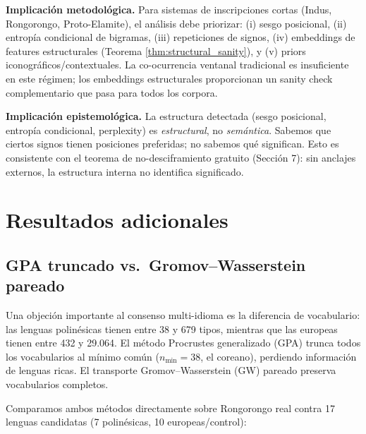 \documentclass[11pt,a4paper]{article}
\newcommand{\1}{\mathbf{1}}
\numberwithin{equation}{section}
\begin{document}
\textbf{Implicación metodológica.} Para sistemas de inscripciones cortas (Indus, Rongorongo, Proto-Elamite), el análisis debe priorizar: (i) sesgo posicional, (ii) entropía condicional de bigramas, (iii) repeticiones de signos, (iv) embeddings de features estructurales (Teorema \ref{thm:structural_sanity}), y (v) priors iconográficos/contextuales. La co-ocurrencia ventanal tradicional es insuficiente en este régimen; los embeddings estructurales proporcionan un sanity check complementario que pasa para todos los corpora.

\textbf{Implicación epistemológica.} La estructura detectada (sesgo posicional, entropía condicional, perplexity) es \emph{estructural}, no \emph{semántica}. Sabemos que ciertos signos tienen posiciones preferidas; no sabemos qué significan. Esto es consistente con el teorema de no-desciframiento gratuito (Sección 7): sin anclajes externos, la estructura interna no identifica significado.

\section{Resultados adicionales}

\subsection{GPA truncado vs.\ Gromov--Wasserstein pareado}

Una objeción importante al consenso multi-idioma es la diferencia de vocabulario: las lenguas polinésicas tienen entre 38 y 679 tipos, mientras que las europeas tienen entre 432 y 29.064. El método Procrustes generalizado (GPA) trunca todos los vocabularios al mínimo común ($n_{\min}=38$, el coreano), perdiendo información de lenguas ricas. El transporte Gromov--Wasserstein (GW) pareado preserva vocabularios completos.

Comparamos ambos métodos directamente sobre Rongorongo real contra 17 lenguas candidatas (7 polinésicas, 10 europeas/control):
\end{document}
